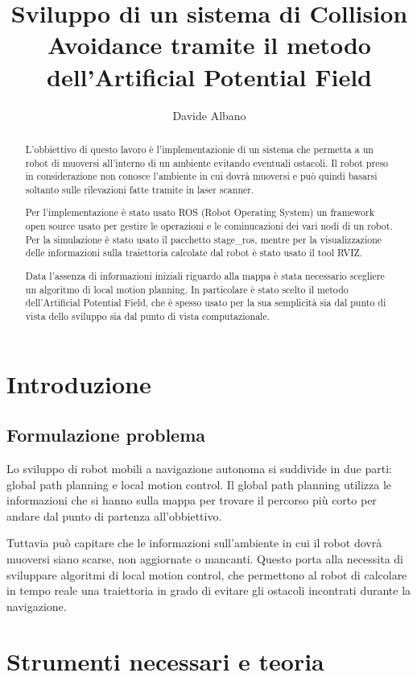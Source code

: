 \documentclass[Lau, binding=0.6cm, oneside]{sapthesis}
\title{Sviluppo di un sistema di Collision Avoidance tramite il metodo dell'Artificial Potential Field}
\author{Davide Albano}
\begin{document}
\maketitle
\begin{abstract}
L'obbiettivo di questo lavoro è l'implementazionie di un sistema che permetta a un robot di muoversi all'interno di un ambiente evitando eventuali ostacoli.
Il robot preso in considerazione non conosce l'ambiente in cui dovrà muoversi e può quindi basarsi soltanto sulle rilevazioni fatte tramite in laser scanner.

Per l'implementazione è stato usato ROS (Robot Operating System) un framework open source usato per gestire le operazioni e le cominucazioni dei vari nodi di un robot.
Per la simulazione è stato usato il pacchetto stage\_ros, mentre per la visualizzazione delle informazioni sulla traiettoria calcolate dal robot è stato usato il tool RVIZ.

Data l'assenza di informazioni iniziali riguardo alla mappa è stata necessario scegliere un algoritmo di local motion planning.
In particolare è stato scelto il metodo dell'Artificial Potential Field, che è spesso usato per la sua semplicità sia dal punto di vista dello sviluppo sia dal punto di vista computazionale.
\end{abstract}
\tableofcontents

\chapter{Introduzione}
\section{Formulazione problema}
Lo sviluppo di robot mobili a navigazione autonoma si suddivide in due parti: global path planning e local motion control.
Il global path planning utilizza le informazioni che si hanno sulla mappa per trovare il percorso più corto per andare dal punto di partenza all'obbiettivo.

Tuttavia può capitare che le informazioni sull'ambiente in cui il robot dovrà muoversi siano scarse, non aggiornate o mancanti.
Questo porta alla necessita di sviluppare algoritmi di local motion control, che permettono al robot di calcolare in tempo reale una traiettoria in grado di evitare gli ostacoli incontrati durante la navigazione.
\cite{fonte1}

\chapter{Strumenti necessari e teoria}
\end{document}
